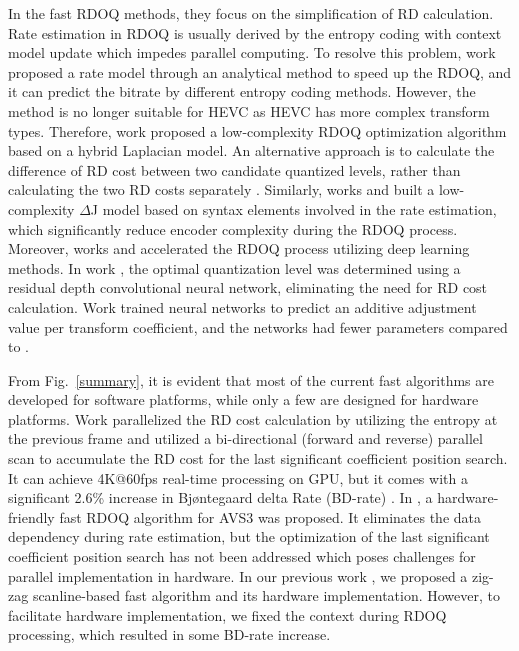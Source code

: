 \documentclass[lettersize,journal]{IEEEtran}
\begin{document}
In the fast RDOQ methods, they focus on the simplification of RD calculation. Rate estimation in RDOQ is usually derived by the entropy coding with context model update which impedes parallel computing. To resolve this problem, work \cite{huang2015efficientquantization} proposed a rate model through an analytical method to speed up the RDOQ, and it can predict the bitrate by different entropy coding methods. However, the method \cite{huang2015efficientquantization} is no longer suitable for HEVC as HEVC has more complex transform types. Therefore, work \cite{cui2017Laplacedistributionbased} proposed a low-complexity RDOQ optimization algorithm based on a hybrid Laplacian model. An alternative approach is to calculate the difference of RD cost between two candidate quantized levels, rather than calculating the two RD costs separately \cite{he2015highimplementationrdoq}. Similarly, works \cite{lee2015fastquantizationmethod} and \cite{wang2016improvedrdoq} built a low-complexity $\Delta$J model based on syntax elements involved in the rate estimation, which significantly reduce encoder complexity during the RDOQ process. Moreover, works \cite{canh2018rate} and \cite{kianfar2020parallelized} accelerated the RDOQ process utilizing deep learning methods. In work \cite{canh2018rate}, the optimal quantization level was determined using a residual depth convolutional neural network, eliminating the need for RD cost calculation. Work \cite{kianfar2020parallelized} trained neural networks to predict an additive adjustment value per transform coefficient, and the networks had fewer parameters compared to \cite{canh2018rate}. 

From Fig.~\ref{summary}, it is evident that most of the current fast algorithms are developed for software platforms, while only a few are designed for hardware platforms. Work \cite{igarashi2018parallelGPU} parallelized the RD cost calculation by utilizing the entropy at the previous frame and utilized a bi-directional (forward and reverse) parallel scan to accumulate the RD cost for the last significant coefficient position search. It can achieve 4K@60fps real-time processing on GPU, but it comes with a significant 2.6\% increase in Bjøntegaard delta Rate (BD-rate) \cite{bjontegaard2001calculationofPSNR}. In \cite{xu2022hardwarefriendlyforrdoq}, a hardware-friendly fast RDOQ algorithm for AVS3 was proposed. It eliminates the data dependency during rate estimation, but the optimization of the last significant coefficient position search has not been addressed which poses challenges for parallel implementation in hardware. In our previous work \cite{zhao2023scanline}, we proposed a zig-zag scanline-based fast algorithm and its hardware implementation. However, to facilitate hardware implementation, we fixed the context during RDOQ processing, which resulted in some BD-rate increase. 
\end{document}
